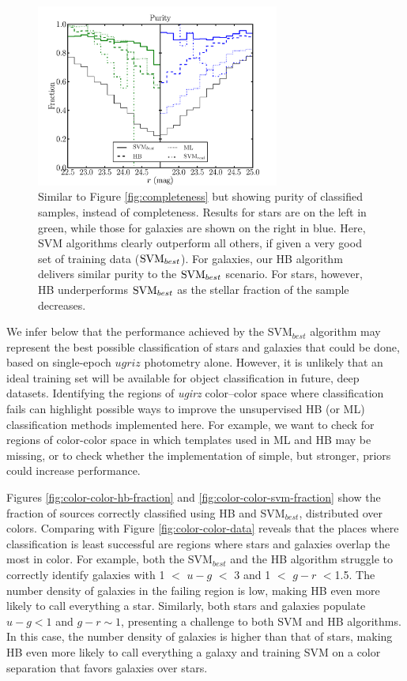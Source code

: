 \documentclass[12pt,preprint]{aastex}
\begin{document}
\begin{figure}
\centering
 \includegraphics[clip=true, trim=0cm 0cm 0.0cm 0.cm,width=8cm]{fig4.pdf}
\caption{Similar to Figure \ref{fig:completeness} but showing purity
  of classified samples, instead of completeness. Results for stars
  are on the left in green, while those for galaxies are shown on the
  right in blue.  Here, SVM algorithms clearly outperform all others,
  if given a very good set of training data (${\rm SVM}_{best}$).  For
  galaxies, our HB algorithm delivers similar purity to the ${\rm
    SVM}_{best}$ scenario.  For stars, however, HB underperforms ${\rm
    SVM}_{best}$ as the stellar fraction of the sample decreases.}
\label{fig:purity}
\end{figure}

We infer below that the performance achieved by the SVM$_{best}$
algorithm may represent the best possible classification of stars and
galaxies that could be done, based on single-epoch $ugriz$ photometry
alone.  However, it is unlikely that an ideal training set will be
available for object classification in future, deep datasets.
Identifying the regions of {\it ugirz} color--color space where
classification fails can highlight possible ways to improve the
unsupervised HB (or ML) classification methods implemented here.  For
example, we want to check for regions of color-color space in which
templates used in ML and HB may be missing, or to check whether the
implementation of simple, but stronger, priors could increase
performance.

Figures \ref{fig:color-color-hb-fraction} and
\ref{fig:color-color-svm-fraction} show the fraction of sources
correctly classified using HB and SVM$_{best}$, distributed over
colors.  Comparing with Figure \ref{fig:color-color-data} reveals that
the places where classification is least successful are regions where
stars and galaxies overlap the most in color.  For example, both the
SVM$_{best}$ and the HB algorithm struggle to correctly identify
galaxies with 1 $<$ $u-g$ $<$ 3 and 1 $<$ $g-r$ $<$1.5.  The number
density of galaxies in the failing region is low, making HB even more
likely to call everything a star.  Similarly, both stars and galaxies
populate $u-g < 1$ and $g-r \sim 1$, presenting a challenge to both
SVM and HB algorithms.  In this case, the number density of galaxies
is higher than that of stars, making HB even more likely to call
everything a galaxy and training SVM on a color separation that favors
galaxies over stars.
\end{document}
